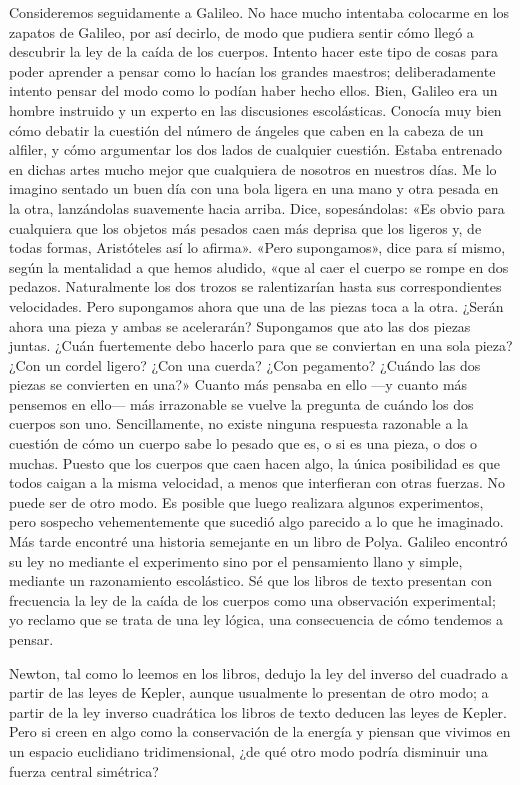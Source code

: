\documentclass[a4paper, 12pt]{article}
\begin{document}
Consideremos seguidamente a Galileo. No hace mucho intentaba colocarme en los zapatos de Galileo, por así decirlo, de modo que pudiera sentir cómo llegó a descubrir la ley de la caída de los cuerpos. Intento hacer este tipo de cosas para poder aprender a pensar como lo hacían los grandes maestros; deliberadamente intento pensar del modo como lo podían haber hecho ellos. Bien, Galileo era un hombre instruido y un experto en las discusiones escolásticas. Conocía muy bien cómo debatir la cuestión del número de ángeles que caben en la cabeza de un alfiler, y cómo argumentar los dos lados de cualquier cuestión. Estaba entrenado en dichas artes mucho mejor que cualquiera de nosotros en nuestros días. Me lo imagino sentado un buen día con una bola ligera en una mano y otra pesada en la otra, lanzándolas suavemente hacia arriba. Dice, sopesándolas: «Es obvio para cualquiera que los objetos más pesados caen más deprisa que los ligeros y, de todas formas, Aristóteles así lo afirma». «Pero supongamos», dice para sí mismo, según la mentalidad a que hemos aludido, «que al caer el cuerpo se rompe en dos pedazos. Naturalmente los dos trozos se ralentizarían hasta sus correspondientes velocidades. Pero supongamos ahora que una de las piezas toca a la otra. ¿Serán ahora una pieza y ambas se acelerarán? Supongamos que ato las dos piezas juntas. ¿Cuán fuertemente debo hacerlo para que se conviertan en una sola pieza? ¿Con un cordel ligero? ¿Con una cuerda? ¿Con pegamento? ¿Cuándo las dos piezas se convierten en una?» Cuanto más pensaba en ello ---y cuanto más pensemos en ello---  más irrazonable se vuelve la pregunta de cuándo los dos cuerpos son uno. Sencillamente, no existe ninguna respuesta razonable a la cuestión de cómo un cuerpo sabe lo pesado que es, o si es una pieza, o dos o muchas. Puesto que los cuerpos que caen hacen algo, la única posibilidad es que todos caigan a la misma velocidad, a menos que interfieran con otras fuerzas. No puede ser de otro modo. Es posible que luego realizara algunos experimentos, pero sospecho vehementemente que sucedió algo parecido a lo que he imaginado. Más tarde encontré una historia semejante en un libro de Polya. Galileo encontró su ley no mediante el experimento sino por el pensamiento llano y simple, mediante un razonamiento escolástico. Sé que los libros de texto presentan con frecuencia la ley de la caída de los cuerpos como una observación experimental; yo reclamo que se trata de una ley lógica, una consecuencia de cómo tendemos a pensar.

 

Newton, tal como lo leemos en los libros, dedujo la ley del inverso del cuadrado a partir de las leyes de Kepler, aunque usualmente lo presentan de otro modo; a partir de la ley inverso cuadrática los libros de texto deducen las leyes de Kepler. Pero si creen en algo como la conservación de la energía y piensan que vivimos en un espacio euclidiano tridimensional, ¿de qué otro modo podría disminuir una fuerza central simétrica?
\end{document}
